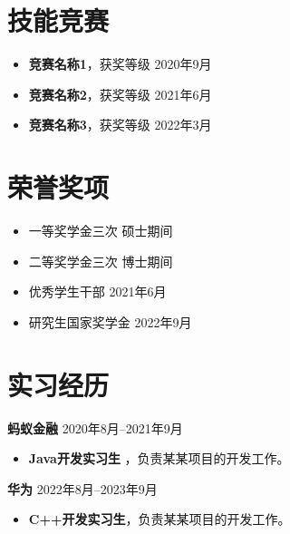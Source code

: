 \documentclass[11pt]{article}
\newlength{\iconwidth}
\begin{document}
    \begin{minipage}[t]{\textwidth}
        \section[技能竞赛]{\makebox[\iconwidth][c]{\color{primary_color}{\faAtom}}\quad 技能竞赛}

        \begin{itemize}
            \item \textbf{竞赛名称1}，获奖等级 \hfill 2020年9月
            \item \textbf{竞赛名称2}，获奖等级 \hfill 2021年6月
            \item \textbf{竞赛名称3}，获奖等级 \hfill 2022年3月
        \end{itemize}
        
    \vspace{1.2em}
    \end{minipage}

    \begin{minipage}[t]{\textwidth}
        \section[荣誉奖项]{\makebox[\iconwidth][c]{\color{primary_color}{\faCrown}}\quad 荣誉奖项}
        

        \begin{itemize}
            \item 一等奖学金三次 \hfill 硕士期间
            \item 二等奖学金三次 \hfill 博士期间
            \item 优秀学生干部 \hfill 2021年6月
            \item 研究生国家奖学金 \hfill 2022年9月
        \end{itemize}
        
    \vspace{1.2em}
    \end{minipage}

    \begin{minipage}[t]{\textwidth}
        \section[实习经历]{\makebox[\iconwidth][c]{\color{primary_color}{\faChalkboardTeacher}}\quad 实习经历}
        
        {\large \textbf{蚂蚁金融}} \hfill 2020年8月--2021年9月
        \begin{itemize}
            \item \textbf{Java开发实习生} ，负责某某项目的开发工作。
        \end{itemize}
        \vspace{0.5em}
        {\large \textbf{华为}} \hfill 2022年8月--2023年9月
        \begin{itemize}
            \item \textbf{C++开发实习生}，负责某某项目的开发工作。
        \end{itemize}

    \vspace{1.2em}
    \end{minipage}
\end{document}
